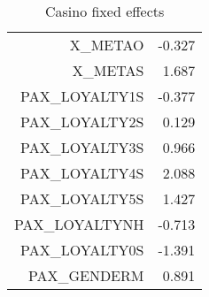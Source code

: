 \documentclass{article}
\begin{document}
\begin{table}[H]
\begin{tabular}{rr}
	X\_METAO	                   &          -0.327          \\        
	X\_METAS	                   &            1.687         \\         
	PAX\_LOYALTY1S    	   &          -0.377          \\        
	PAX\_LOYALTY2S    	   &       0.129              \\    
	PAX\_LOYALTY3S    	   &       0.966              \\    
	PAX\_LOYALTY4S    	   &      2.088               \\   
	PAX\_LOYALTY5S    	   &      1.427               \\   
	PAX\_LOYALTYNH    	   &      -0.713              \\    
	PAX\_LOYALTY0S	           &       -1.391             \\     
	PAX\_GENDERM	           &         0.891            \\    
	\hline 
	\hline 
	\end{tabular}
	\caption{Casino fixed effects}
\end{table}
\end{document}
